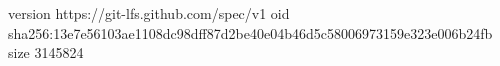 version https://git-lfs.github.com/spec/v1
oid sha256:13e7e56103ae1108dc98dff87d2be40e04b46d5c58006973159e323e006b24fb
size 3145824
